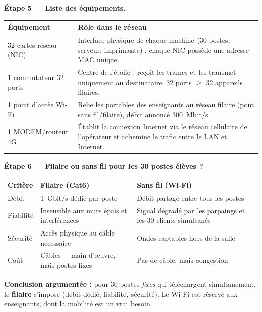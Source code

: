 \documentclass[11pt]{article}
\begin{document}
\begin{exoresolu}
\textbf{Étape 5 — Liste des équipements.}

\begin{center}
\begin{tabularx}{\linewidth}{|l|X|}
\hline
\rowcolor{popblueL} \textbf{Équipement} & \textbf{Rôle dans le réseau} \\
\hline
32 cartes réseau (NIC) & Interface physique de chaque machine (30 postes, serveur, imprimante) ; chaque NIC possède une adresse MAC unique. \\
\hline
1 commutateur 32 ports & Centre de l'étoile : reçoit les trames et les transmet uniquement au destinataire. 32 ports $\geq$ 32 appareils filaires. \\
\hline
1 point d'accès Wi-Fi & Relie les portables des enseignants au réseau filaire (pont sans fil/filaire), débit annoncé \SI{300}{Mbit/s}. \\
\hline
1 MODEM/routeur 4G & Établit la connexion Internet via le réseau cellulaire de l'opérateur et achemine le trafic entre le LAN et Internet. \\
\hline
\end{tabularx}
\end{center}

\textbf{Étape 6 — Filaire ou sans fil pour les 30 postes élèves ?}

\begin{center}
\begin{tabularx}{\linewidth}{|l|X|X|}
\hline
\rowcolor{popblueL} \textbf{Critère} & \textbf{Filaire (Cat6)} & \textbf{Sans fil (Wi-Fi)} \\
\hline
Débit & \SI{1}{Gbit/s} dédié par poste & Débit partagé entre tous les postes \\
\hline
Fiabilité & Insensible aux murs épais et interférences & Signal dégradé par les parpaings et les 30 clients simultanés \\
\hline
Sécurité & Accès physique au câble nécessaire & Ondes captables hors de la salle \\
\hline
Coût & Câbles + main-d'\oe uvre, mais postes fixes & Pas de câble, mais congestion \\
\hline
\end{tabularx}
\end{center}

\textbf{Conclusion argumentée :} pour 30 postes \emph{fixes} qui téléchargent simultanément, le \textbf{filaire} s'impose (débit dédié, fiabilité, sécurité). Le Wi-Fi est réservé aux enseignants, dont la mobilité est un vrai besoin.


\end{exoresolu}
\end{document}
